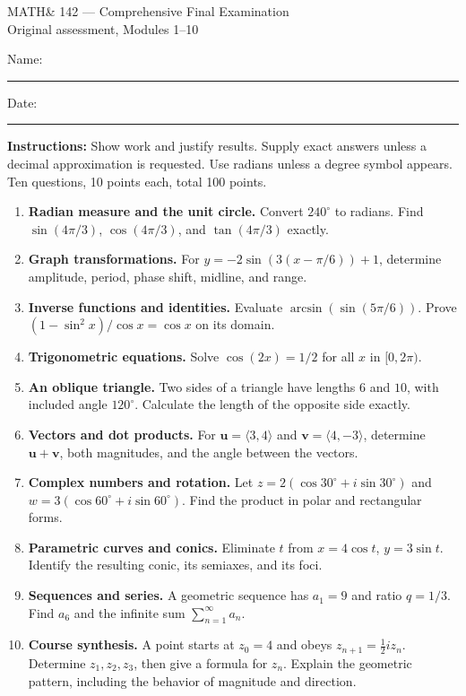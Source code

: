 \documentclass[11pt]{article}
\newcommand{\workspace}{\par\vspace{.9in}}
\begin{document}
\begin{center}{\LARGE MATH\& 142 --- Comprehensive Final Examination}\\[4pt]
{\large Original assessment, Modules 1--10}\end{center}
Name:\ \rule{3in}{.4pt}\hfill Date:\ \rule{1.35in}{.4pt}

\smallskip\noindent\textbf{Instructions:} Show work and justify results. Supply exact answers unless a decimal approximation is requested. Use radians unless a degree symbol appears. Ten questions, 10 points each, total 100 points.
\begin{enumerate}
\item \textbf{Radian measure and the unit circle.} Convert $240^\circ$ to radians. Find $\sin(4\pi/3)$, $\cos(4\pi/3)$, and $\tan(4\pi/3)$ exactly.\workspace
\item \textbf{Graph transformations.} For $y=-2\sin(3(x-\pi/6))+1$, determine amplitude, period, phase shift, midline, and range.\workspace
\item \textbf{Inverse functions and identities.} Evaluate $\arcsin(\sin(5\pi/6))$. Prove $(1-\sin^2x)/\cos x=\cos x$ on its domain.\workspace
\item \textbf{Trigonometric equations.} Solve $\cos(2x)=1/2$ for all $x$ in $[0,2\pi)$.\workspace
\item \textbf{An oblique triangle.} Two sides of a triangle have lengths $6$ and $10$, with included angle $120^\circ$. Calculate the length of the opposite side exactly.\workspace
\item \textbf{Vectors and dot products.} For $\mathbf u=\langle3,4\rangle$ and $\mathbf v=\langle4,-3\rangle$, determine $\mathbf u+\mathbf v$, both magnitudes, and the angle between the vectors.\workspace
\item \textbf{Complex numbers and rotation.} Let $z=2(\cos30^\circ+i\sin30^\circ)$ and $w=3(\cos60^\circ+i\sin60^\circ)$. Find the product in polar and rectangular forms.\workspace
\item \textbf{Parametric curves and conics.} Eliminate $t$ from $x=4\cos t$, $y=3\sin t$. Identify the resulting conic, its semiaxes, and its foci.\workspace
\item \textbf{Sequences and series.} A geometric sequence has $a_1=9$ and ratio $q=1/3$. Find $a_6$ and the infinite sum $\sum_{n=1}^{\infty}a_n$.\workspace
\item \textbf{Course synthesis.} A point starts at $z_0=4$ and obeys $z_{n+1}=\frac12 i z_n$. Determine $z_1,z_2,z_3$, then give a formula for $z_n$. Explain the geometric pattern, including the behavior of magnitude and direction.\workspace
\end{enumerate}
\end{document}
